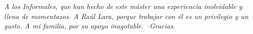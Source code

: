 
\newpage
\vspace*{\fill}

\noindent
\begin{minipage}[t]{\textwidth}
\raggedright
\textit{
A los Informales, que han hecho de este máster una experiencia inolvidable y llena de momentazos.
A Raúl Lara, porque trabajar con él es un privilegio y un gusto.
A mi familia, por su apoyo inagotable.
--Gracias.
}


\end{minipage}

\vspace*{\fill}
\newpage






